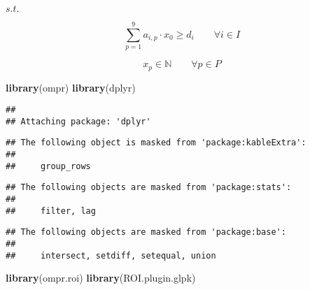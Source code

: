 \documentclass[
]{article}
\newenvironment{Shaded}{\begin{snugshade}}{\end{snugshade}}
\newcommand{\DataTypeTok}[1]{\textcolor[rgb]{0.13,0.29,0.53}{#1}}
\newcommand{\DecValTok}[1]{\textcolor[rgb]{0.00,0.00,0.81}{#1}}
\newcommand{\KeywordTok}[1]{\textcolor[rgb]{0.13,0.29,0.53}{\textbf{#1}}}
\newcommand{\NormalTok}[1]{#1}
\newcommand{\OperatorTok}[1]{\textcolor[rgb]{0.81,0.36,0.00}{\textbf{#1}}}
\newcommand{\StringTok}[1]{\textcolor[rgb]{0.31,0.60,0.02}{#1}}
\begin{document}
\(s.t.\)

\[ \sum_{p=1}^9 a_{i,p}\cdot x_0\ge d_i  \qquad \forall i \in I \]

\[x_p \in \mathbb N \qquad \forall p \in P \]

\begin{Shaded}
\begin{Highlighting}[]
\KeywordTok{library}\NormalTok{(ompr)}
\KeywordTok{library}\NormalTok{(dplyr)}
\end{Highlighting}
\end{Shaded}

\begin{verbatim}
## 
## Attaching package: 'dplyr'
\end{verbatim}

\begin{verbatim}
## The following object is masked from 'package:kableExtra':
## 
##     group_rows
\end{verbatim}

\begin{verbatim}
## The following objects are masked from 'package:stats':
## 
##     filter, lag
\end{verbatim}

\begin{verbatim}
## The following objects are masked from 'package:base':
## 
##     intersect, setdiff, setequal, union
\end{verbatim}

\begin{Shaded}
\begin{Highlighting}[]
\KeywordTok{library}\NormalTok{(ompr.roi)}
\KeywordTok{library}\NormalTok{(ROI.plugin.glpk)}
\end{Highlighting}
\end{Shaded}

\begin{Shaded}
\end{Shaded}
\end{document}
